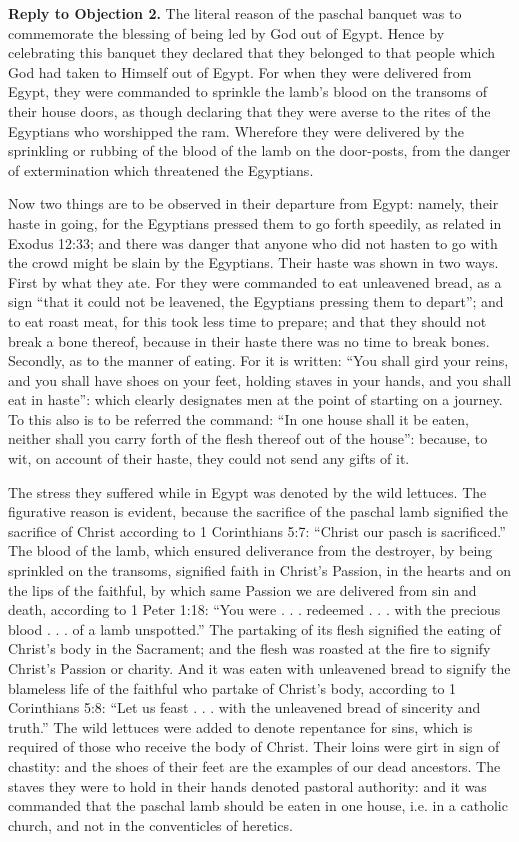 \textbf{Reply to Objection 2.} The literal reason of the paschal banquet was to commemorate the blessing of being led by God out of Egypt. Hence by celebrating this banquet they declared that they belonged to that people which God had taken to Himself out of Egypt. For when they were delivered from Egypt, they were commanded to sprinkle the lamb's blood on the transoms of their house doors, as though declaring that they were averse to the rites of the Egyptians who worshipped the ram. Wherefore they were delivered by the sprinkling or rubbing of the blood of the lamb on the door-posts, from the danger of extermination which threatened the Egyptians.

Now two things are to be observed in their departure from Egypt: namely, their haste in going, for the Egyptians pressed them to go forth speedily, as related in Exodus 12:33; and there was danger that anyone who did not hasten to go with the crowd might be slain by the Egyptians. Their haste was shown in two ways. First by what they ate. For they were commanded to eat unleavened bread, as a sign ``that it could not be leavened, the Egyptians pressing them to depart''; and to eat roast meat, for this took less time to prepare; and that they should not break a bone thereof, because in their haste there was no time to break bones. Secondly, as to the manner of eating. For it is written: ``You shall gird your reins, and you shall have shoes on your feet, holding staves in your hands, and you shall eat in haste'': which clearly designates men at the point of starting on a journey. To this also is to be referred the command: ``In one house shall it be eaten, neither shall you carry forth of the flesh thereof out of the house'': because, to wit, on account of their haste, they could not send any gifts of it.

The stress they suffered while in Egypt was denoted by the wild lettuces. The figurative reason is evident, because the sacrifice of the paschal lamb signified the sacrifice of Christ according to 1 Corinthians 5:7: ``Christ our pasch is sacrificed.'' The blood of the lamb, which ensured deliverance from the destroyer, by being sprinkled on the transoms, signified faith in Christ's Passion, in the hearts and on the lips of the faithful, by which same Passion we are delivered from sin and death, according to 1 Peter 1:18: ``You were . . . redeemed . . . with the precious blood . . . of a lamb unspotted.'' The partaking of its flesh signified the eating of Christ's body in the Sacrament; and the flesh was roasted at the fire to signify Christ's Passion or charity. And it was eaten with unleavened bread to signify the blameless life of the faithful who partake of Christ's body, according to 1 Corinthians 5:8: ``Let us feast . . . with the unleavened bread of sincerity and truth.'' The wild lettuces were added to denote repentance for sins, which is required of those who receive the body of Christ. Their loins were girt in sign of chastity: and the shoes of their feet are the examples of our dead ancestors. The staves they were to hold in their hands denoted pastoral authority: and it was commanded that the paschal lamb should be eaten in one house, i.e. in a catholic church, and not in the conventicles of heretics.

